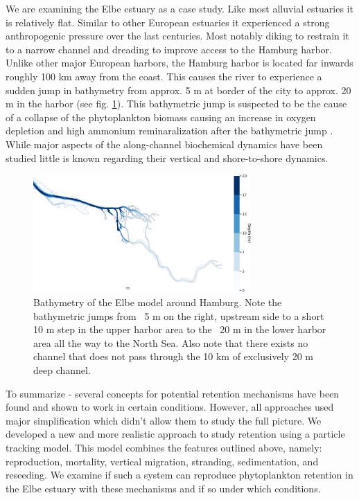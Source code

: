 \documentclass[npg, manuscript]{copernicus}
\begin{document}
We are examining the Elbe estuary as a case study.
Like most alluvial estuaries it is relatively flat.
Similar to other European estuaries it experienced a strong anthropogenic pressure over the last centuries.
Most notably diking to restrain it to a narrow channel and dreading to improve access to the Hamburg harbor.
Unlike other major European harbors, the Hamburg harbor is located far inwards roughly 100 \unit{km} away from the coast.
This causes the river to experience a sudden jump in bathymetry from approx. 5 \unit{m} at border of the city to approx. 20 \unit{m} in the harbor (see fig. \ref{fig:bathymetry}). 
This bathymetric jump is suspected to be the cause of a collapse of the phytoplankton biomass causing an increase in oxygen depletion and high ammonium reminaralization after the bathymetric jump \citep{Schroeder1997,Holzwarth2018,Sanders2018}.
While major aspects of the along-channel biochemical dynamics have been studied little is known regarding their vertical and shore-to-shore dynamics.

\begin{figure}
    \includegraphics[width=8.3cm]{figures/harbor.png}
    \caption{Bathymetry of the Elbe model around Hamburg. Note the bathymetric jumps from ~5 \unit{m} on the right, upstream side to a short 10 \unit{m} step in the upper harbor area to the ~20 \unit{m} in the lower harbor area all the way to the North Sea. Also note that there exists no channel that does not pass through the 10 \unit{km} of exclusively 20 \unit{m} deep channel.}
    \label{fig:bathymetry}
\end{figure}

To summarize - several concepts for potential retention mechanisms have been found
 and shown to work in certain conditions.
However, all approaches used major simplification which didn't allow them to study the full picture.
We developed a new and more realistic approach to study retention using a particle tracking model.
This model combines the features outlined above, namely: reproduction, mortality, vertical migration, stranding, sedimentation, and reseeding.
We examine if such a system can reproduce phytoplankton retention in the Elbe estuary with these mechanisms and if so under which conditions.
\end{document}

